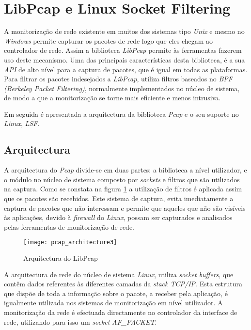 \section{LibPcap e Linux Socket Filtering}\label{sect:LibPcap}

A monitorização de rede existente em muitos dos sistemas tipo \textit{Unix} e mesmo no \textit{Windows} permite capturar os pacotes de rede logo que eles chegam ao controlador de rede.
Assim a biblioteca \textit{LibPcap}\cite{:LibPcap} permite às ferramentas fazerem uso deste mecanismo.
Uma das principais características desta biblioteca, é a sua \textit{API} de alto nível para a captura de pacotes, que é igual em todas as plataformas.
Para filtrar os pacotes indesejados a \textit{LibPcap}, utiliza filtros baseados no \textit{BPF (Berkeley Packet Filtering)}, normalmente implementados no núcleo de sistema, de modo a que a monitorização se torne mais eficiente e menos intrusiva.

Em seguida é apresentada a arquitectura da biblioteca \textit{Pcap} e o seu suporte no \textit{Linux}, \textit{LSF}.

\subsection {Arquitectura}
\label{sect:architecture_libpcap}
A arquitectura do \textit{Pcap} divide-se em duas partes: a biblioteca a nível utilizador, e o módulo no núcleo de sistema composto por \textit{sockets} e filtros que são utilizados na captura.
Como se constata na figura \ref{fig:pcap_architecture} a utilização de filtros é aplicada assim que os pacotes são recebidos.
Este sistema de captura, evita imediatamente a captura de pacotes que não interessam e permite que aqueles que não são visíveis às aplicações, devido à \textit{firewall} do \textit{Linux}, possam ser capturados e analisados pelas ferramentas de monitorização de rede.

\begin{figure}[htbp]
       \centering
       \texttt{[image: pcap\_architecture3]}
       \caption{Arquitectura do LibPcap}
      \label{fig:pcap_architecture}
\end{figure}

A arquitectura de rede do núcleo de sistema \textit{Linux}, utiliza \textit{socket buffers}, que contêm dados referentes às diferentes camadas da \textit{stack TCP/IP}.
Esta estrutura que dispõe de toda a informação sobre o pacote, a receber pela aplicação, é igualmente utilizada nos sistemas de monitorização em nível utilizador.
A monitorização da rede é efectuada directamente no controlador da interface de rede, utilizando para isso um \textit{socket} \textit{AF\_PACKET}.

